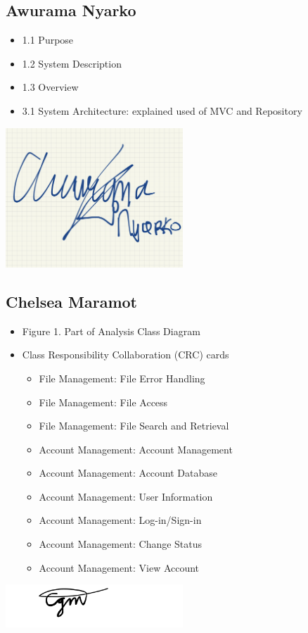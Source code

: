 \documentclass[]{article}
\begin{document}
\subsection{Awurama Nyarko}
\label{subsec:awurama_nyarko}
\begin{itemize}
	\item 1.1 Purpose
	\item 1.2 System Description
	\item 1.3 Overview
	\item 3.1 System Architecture: explained used of MVC and Repository
\end{itemize}
\includegraphics[width=0.5\textwidth]{awurama.jpg}

\subsection{Chelsea Maramot}
\label{subsec:chelsea_maramot}
\begin{itemize}
	\item Figure 1. Part of Analysis Class Diagram
	\item Class Responsibility Collaboration (CRC) cards
 		\begin{itemize}
   			\item File Management: File Error Handling
      			\item File Management: File Access
	 		\item File Management: File Search and Retrieval
    			\item Account Management: Account Management
       			\item Account Management: Account Database
	  		\item Account Management: User Information
     			\item Account Management: Log-in/Sign-in
			\item Account Management: Change Status
   			\item Account Management: View Account
      		\end{itemize}
\end{itemize}
\includegraphics[width=0.5\textwidth]{chelsea.png}
\end{document}
